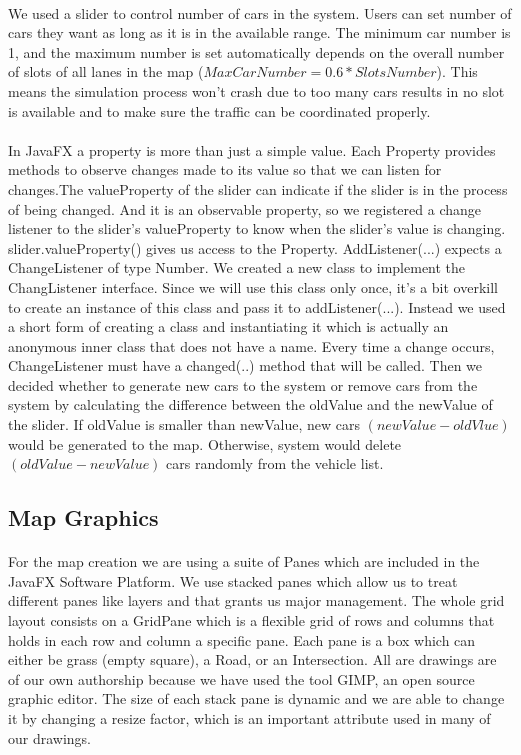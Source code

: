 \documentclass[a4paper,11pt,titlepage]{article}
\begin{document}
\paragraph{}
We used a slider to control number of cars in the system. Users can set number of cars they want as long as  it is in the available range. The minimum car number is 1, and the maximum number is set automatically depends on the overall number of slots of all lanes in the map ($MaxCarNumber=0.6*SlotsNumber$). This means the simulation process won't crash due to too many cars results in no slot is available and to make sure the traffic can be coordinated properly. 
\paragraph{}
In JavaFX a property is more than just a simple value. Each Property provides methods to observe changes made to its value so that we can listen for changes.The valueProperty of the slider can indicate if the slider is in the process of being changed. And it is an observable property, so we registered a change listener to the slider's valueProperty to know when the slider's value is changing. slider.valueProperty() gives us access to the Property. AddListener(...) expects a ChangeListener of type Number. We created a new class to implement the ChangListener interface. Since we will use this class only once, it's a bit overkill to create an instance of this class and pass it to addListener(...). Instead we used a short form of creating a class and instantiating it which is actually an anonymous inner class that does not have a name. Every time a change occurs, ChangeListener must have a changed(..) method that will be called. Then we decided whether to generate new cars to the system or remove cars from the system by calculating the difference between the oldValue and the newValue of the slider.
If oldValue is smaller than newValue, new cars $(newValue - oldVlue)$ would be generated to the map. Otherwise, system would delete $(oldValue - newValue)$ cars randomly from the vehicle list. 

\subsection{Map Graphics}
\paragraph{}
For the map creation we are using a suite of Panes which are included in the JavaFX Software Platform. We use stacked panes which allow us to treat different panes like layers and that grants us major management. The whole grid layout consists on a GridPane which is a flexible grid of rows and columns that holds in each row and column a specific pane. Each pane is a box which can either be grass (empty square), a Road, or an Intersection. All are drawings are of our own authorship because we have used the tool GIMP, an open source graphic editor. The size of each stack pane is dynamic and we are able to change it by changing a resize factor, which is an important attribute used in many of our drawings. 
\end{document}
